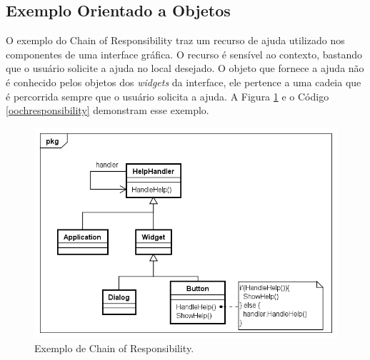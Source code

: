 \subsection*{Exemplo Orientado a Objetos}

O exemplo do Chain of Responsibility traz um recurso 
de ajuda utilizado nos componentes de uma 
interface gráfica. O recurso é sensível ao contexto, 
bastando que o usuário solicite a ajuda no local 
desejado. O objeto que fornece a ajuda não é 
conhecido pelos objetos dos \textit{widgets} da 
interface, ele pertence a uma cadeia que é 
percorrida sempre que o usuário solicita 
a ajuda. A Figura \ref{chain_exemplo} e o Código 
\ref{oochresponsibility} demonstram esse exemplo.

\begin{figure}[htb]
	\caption{\label{chain_exemplo}Exemplo de Chain of Responsibility.}
	\begin{center}
	    \includegraphics[scale=0.5]{5_padroes-contexto-funcional/5.3_comportamentais/5.3.01_chain-of-responsibility/chainofresponsibility_exemplo.png}
	\end{center}
\end{figure}

